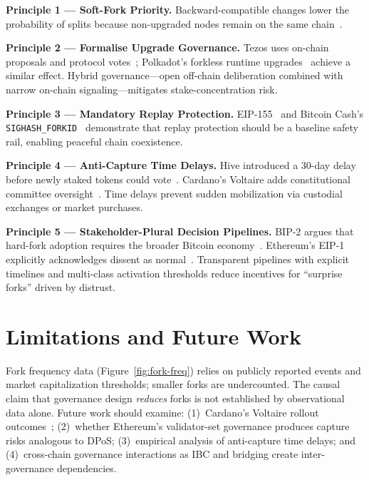 \documentclass[sigconf,nonacm]{acmart}
\begin{document}
{\raggedright
\textbf{Principle 1 --- Soft-Fork Priority.}
Backward-compatible changes lower the probability of splits because non-upgraded nodes
remain on the same chain~\cite{bip9,bitcoincore-versionbits}.

\textbf{Principle 2 --- Formalise Upgrade Governance.}
Tezos uses on-chain proposals and protocol votes~\cite{tezos-governance}; Polkadot's
forkless runtime upgrades~\cite{polkadot-runtimeupgrades} achieve a similar effect.
Hybrid governance---open off-chain deliberation combined with narrow on-chain
signaling---mitigates stake-concentration risk.

\textbf{Principle 3 --- Mandatory Replay Protection.}
EIP-155~\cite{eip155} and Bitcoin Cash's \texttt{SIGHASH\_FORKID}~\cite{uahf-spec}
demonstrate that replay protection should be a baseline safety rail, enabling peaceful
chain coexistence.

\textbf{Principle 4 --- Anti-Capture Time Delays.}
Hive introduced a 30-day delay before newly staked tokens could vote~\cite{hive-launch}.
Cardano's Voltaire adds constitutional committee oversight~\cite{cardano-voltaire2024}.
Time delays prevent sudden mobilization via custodial exchanges or market purchases.

\textbf{Principle 5 --- Stakeholder-Plural Decision Pipelines.}
BIP-2 argues that hard-fork adoption requires the broader Bitcoin economy~\cite{bip2}.
Ethereum's EIP-1 explicitly acknowledges dissent as normal~\cite{ethereum-eip1}.
Transparent pipelines with explicit timelines and multi-class activation thresholds
reduce incentives for ``surprise forks'' driven by distrust.

\section{Limitations and Future Work}

Fork frequency data (Figure~\ref{fig:fork-freq}) relies on publicly reported events and
market capitalization thresholds; smaller forks are undercounted. The causal claim that
governance design \emph{reduces} forks is not established by observational data alone.
Future work should examine: (1)~Cardano's Voltaire rollout outcomes~\cite{cardano-voltaire2024};
(2)~whether Ethereum's validator-set governance produces capture risks analogous to DPoS;
(3)~empirical analysis of anti-capture time delays; and (4)~cross-chain governance
interactions as IBC and bridging create inter-governance dependencies.

}
\end{document}
